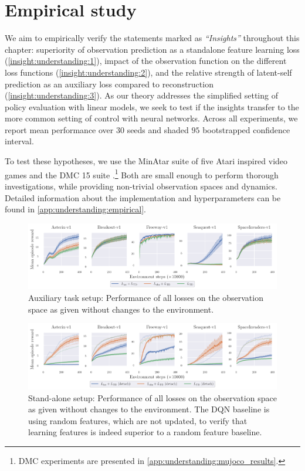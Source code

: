 \section{Empirical study}
\label{sec:understanding:empirical}

We aim to empirically verify the statements marked as \emph{``Insights''} throughout this chapter: superiority of observation prediction as a standalone feature learning loss (\autoref{insight:understanding:1}), impact of the observation function on the different loss functions (\autoref{insight:understanding:2}), and the relative strength of latent-self prediction as an auxiliary loss compared to reconstruction (\autoref{insight:understanding:3}). 
As our theory addresses the simplified setting of policy evaluation with linear models, we seek to test if the insights transfer to the more common setting of control with neural networks.
Across all experiments, we report mean performance over 30 seeds and shaded $95$ bootstrapped confidence interval.

To test these hypotheses, we use the MinAtar suite of five Atari inspired video games \parencite{young19minatar} and the DMC 15 suite  \parencite{tunyasuvunakool2020dmcontrol}.\footnote{DMC experiments are presented in \autoref{app:understanding:mujoco_results}.}
Both are small enough to perform thorough investigations, while providing non-trivial observation spaces and dynamics.
Detailed information about the implementation and hyperparameters can be found in \autoref{app:understanding:empirical}.

\begin{figure}[t]
    \centering
    \includegraphics[width=\textwidth]{figures/understanding/rlc2024_minatar.pdf}
    \caption{Auxiliary task setup: Performance of all losses on the observation space as given without changes to the environment.}
    \label{fig:understanding:aux}
\end{figure}

\begin{figure}[t]
    \centering
    \includegraphics[width=\textwidth]{figures/understanding/rlc2024-detach_minatar.pdf}
    \caption{Stand-alone setup: Performance of all losses on the observation space as given without changes to the environment. The DQN baseline is using random features, which are not updated, to verify that learning features is indeed superior to a random feature baseline.}
    \label{fig:understanding:sta}
\end{figure}


